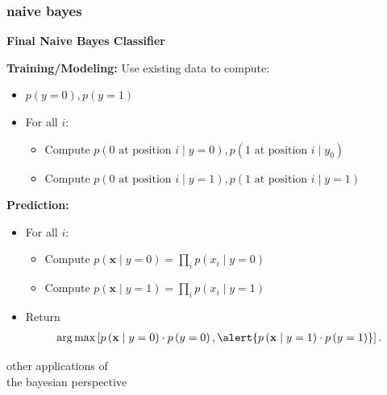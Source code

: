 \documentclass[handout,compress]{beamer}
\newcommand{\bv}[1]{\mathbf{#1}}
\DeclareMathOperator*{\argmax}{arg\,max}
\begin{document}
\begin{frame}
	\frametitle{naive bayes}
	\begin{center}
		\textbf{Final Naive Bayes Classifier}
	\end{center}
	\textbf{Training/Modeling:} Use existing data to compute:
	\begin{itemize}
		\item $p(y=0),p(y=1)$
		\item For all $i$:
		\begin{itemize}
			\item Compute $p(0 \text{ at position $i$} \mid y = 0), p(1\text{ at position $i$}  \mid y_0)$
			\item Compute $p(0 \text{ at position $i$} \mid y=1), p(1\text{ at position $i$}  \mid y=1)$
		\end{itemize}
	\end{itemize}

	\textbf{Prediction:} 
\begin{itemize}
	\item For all $i$:
	\begin{itemize}
		\item Compute $p(\bv{x}\mid y=0) = \prod_i p(x_i \mid y=0)$
		\item Compute $p(\bv{x}\mid y=1) = \prod_i p(x_i \mid y=1)$
	\end{itemize}
	\item Return 
	\begin{align*}
			\argmax \left[ p\left(\bv{x} \mid y=0\right)\cdot p\left(y=0\right), \alert{p\left(\bv{x}\mid y=1 \right)\cdot p\left(y=1\right)} \right].
	\end{align*}
\end{itemize}
\end{frame} 

\begin{frame}[standout]
	other applications of \\
	\alert{the bayesian perspective}
\end{frame}
\end{document}
